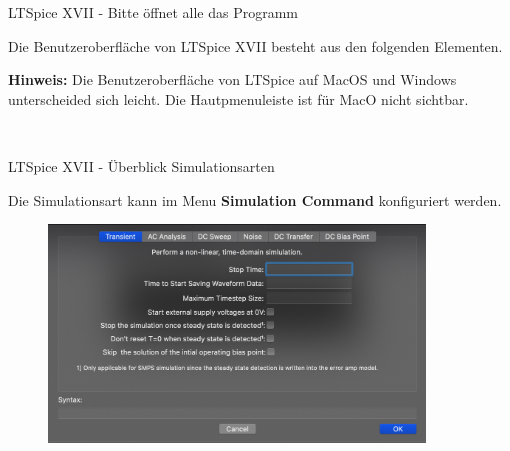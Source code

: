 \documentclass{beamer}
\begin{document}
\begin{frame}[fragile]{LTSpice XVII - Bitte öffnet alle das Programm}
	
Die Benutzeroberfläche von LTSpice XVII besteht aus den folgenden Elementen.
\begin{spacing}{0.6} \begin{tiny} \textbf{Hinweis:} Die Benutzeroberfläche von LTSpice auf MacOS und Windows unterscheided sich leicht. 
  Die Hautpmenuleiste ist für MacO nicht sichtbar.
  \end{tiny} \end{spacing}

\begin{figure}
  \centering
  \\
  \qquad    
\end{figure}

  \end{frame}

  \begin{frame}{LTSpice XVII - Überblick Simulationsarten}

    Die Simulationsart kann im Menu \textbf{Simulation Command} konfiguriert werden. 

    \begin{figure}
      \centering
      \includegraphics[width=10cm]{pictures/simulationcmd.png}
    \end{figure}
    
  \end{frame}
\end{document}
